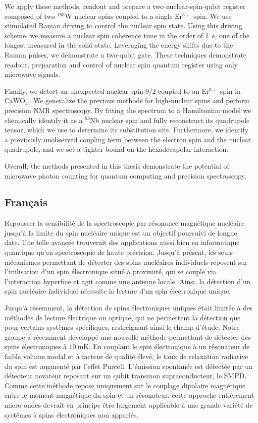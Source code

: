 We apply these methods, readout and prepare a two-nuclear-spin-qubit register composed of two $^{183}$W nuclear spins coupled to a single Er$^{3+}$ spin. We use stimulated Raman driving to control the nuclear spin state. Using this driving scheme, we measure a nuclear spin coherence time in the order of 1~s, one of the longest measured in the solid-state. Leveraging the energy shifts due to the Raman pulses, we demonstrate a two-qubit gate. These techniques demonstrate readout, preparation and control of nuclear spin quantum register using only microwave signals.

Finally, we detect an unexpected nuclear spin-9/2 coupled to an Er$^{3+}$ spin in CaWO$_4$\,. We generalize the previous methods for high-nuclear spins and perform precision NMR spectroscopy. By fitting the spectrum to a Hamiltonian model we chemically identify it as a $^{93}$Nb nuclear spin and fully reconstruct its quadrupole tensor, which we use to determine its substitution site. Furthermore, we identify a previously unobserved coupling term between the electron spin and the nuclear quadrupole, and we set a tighter bound on the hexadecapolar interaction.

Overall, the methods presented in this thesis demonstrate the potential of microwave photon counting for quantum computing and precision spectroscopy.

\newpage

\subsection*{Français}

Repousser la sensibilité de la spectroscopie par résonance magnétique nucléaire jusqu'à la limite du spin nucléaire unique est un objectif poursuivi de longue date. Une telle avancée trouverait des applications aussi bien en informatique quantique qu'en spectroscopie de haute précision. Jusqu'à présent, les seuls mécanismes permettant de détecter des spins nucléaires individuels reposent sur l'utilisation d'un spin électronique situé à proximité, qui se couple via l'interaction hyperfine et agit comme une antenne locale. Ainsi, la détection d'un spin nucléaire individuel nécessite la lecture d'un spin électronique unique.

Jusqu'à récemment, la détection de spins électroniques uniques était limitée à des méthodes de lecture électrique ou optique, qui ne permettent la détection que pour certains systèmes spécifiques, restreignant ainsi le champ d'étude. Notre groupe a récemment développé une nouvelle méthode permettant de détecter des spins électroniques à $10~\mathrm{mK}$. En couplant le spin électronique à un résonateur de faible volume modal et à facteur de qualité élevé, le taux de relaxation radiative du spin est augmenté par l'effet Purcell. L'émission spontanée est détectée par un détecteur novateur reposant sur un qubit transmon supraconducteur, le SMPD. Comme cette méthode repose uniquement sur le couplage dipolaire magnétique entre le moment magnétique du spin et un résonateur, cette approche entièrement micro-ondes devrait en principe être largement applicable à une grande variété de systèmes à spins électroniques non appariés.

